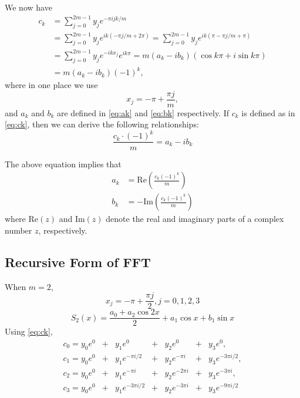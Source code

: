 We now have \begin{equation*}
\begin{split}
c_k & = \sum_{j=0}^{2m-1} y_j e^{-\pi ijk/m} \\
& = \sum_{j=0}^{2m-1} y_j e^{ik(-\pi j/m + 2\pi)} = \sum_{j=0}^{2m-1} y_j e^{ik(\pi -\pi j/m + \pi)} \\
& = \sum_{j=0}^{2m-1} y_j e^{-ik x_j} e^{ik\pi} = m(a_k - i b_k) (\cos k\pi + i \sin k\pi)\\
& = m (a_k - i b_k) (-1)^k,
\end{split}
\end{equation*}
where in one place we use
\begin{equation*}
  x_j = -\pi + \frac{\pi j}{m},
\end{equation*}
and $a_k$ and $b_k$ are defined in \eqref{eq:ak} and \eqref{eq:bk} respectively. If $c_k$ is defined as in \eqref{eq:ck}, then we can derive the following relationships: \[
    \frac{c_k \cdot (-1)^k}{m} = a_k - i b_k
\]

The above equation implies that \begin{equation*}
  \begin{split}
    a_k & = \textrm{Re}\left(\frac{c_k (-1)^k}{m}\right)\\
    b_k & = -\textrm{Im}\left(\frac{c_k (-1)^k}{m}\right)
  \end{split}
\end{equation*}
where $\textrm{Re}(z)$ and $\textrm{Im}(z)$ denote the real and imaginary parts of a complex number $z$, respectively.

\subsection{Recursive Form of FFT}

When $m = 2$, \[
    x_j = -\pi + \frac{\pi j}{2}, j = 0, 1, 2, 3
\]
\[
    S_2(x) = \frac{a_0 + a_2 \cos 2x}{2} + a_1 \cos x + b_1 \sin x
\]
Using \eqref{eq:ck}, \begin{equation*}
\begin{array}{rrrrrrr}
c_0 = y_0 e^0 & + &  y_1 e^0         & + & y_2e^0        & + & y_3 e^{0}         , \\   
c_1 = y_0 e^0 & + &  y_1 e^{-\pi i/2} & + & y_2e^{-\pi i}  & + & y_3 e^{-3\pi i/2}  , \\   
c_2 = y_0 e^0 & + &  y_1 e^{-\pi i}   & + & y_2e^{-2\pi i} & + & y_3 e^{-3\pi i}    , \\   
c_3 = y_0 e^0 & + &  y_1 e^{-3\pi i/2}& + & y_2e^{-3 \pi i}& + & y_3 e^{-9 \pi i /2}
\end{array}
\end{equation*}


